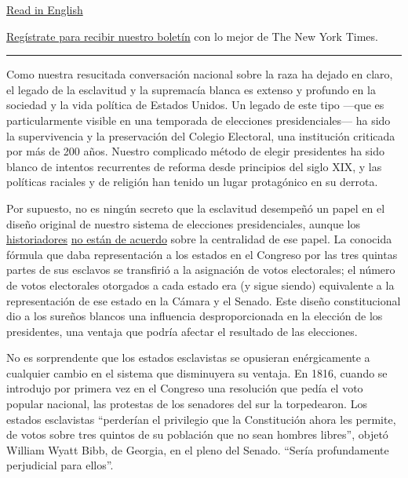 \href{https://www.nytimes.com/2020/08/03/opinion/electoral-college-racism-white-supremacy.html}{Read
in English}

\href{https://www.nytimes.com/newsletters/el-times}{Regístrate para
recibir nuestro boletín} con lo mejor de The New York Times.

\begin{center}\rule{0.5\linewidth}{\linethickness}\end{center}

Como nuestra resucitada conversación nacional sobre la raza ha dejado en
claro, el legado de la esclavitud y la supremacía blanca es extenso y
profundo en la sociedad y la vida política de Estados Unidos. Un legado
de este tipo ---que es particularmente visible en una temporada de
elecciones presidenciales--- ha sido la supervivencia y la preservación
del Colegio Electoral, una institución criticada por más de 200 años.
Nuestro complicado método de elegir presidentes ha sido blanco de
intentos recurrentes de reforma desde principios del siglo XIX, y las
políticas raciales y de religión han tenido un lugar protagónico en su
derrota.

Por supuesto, no es ningún secreto que la esclavitud desempeñó un papel
en el diseño original de nuestro sistema de elecciones presidenciales,
aunque los
\href{https://www.nytimes.com/2019/04/04/opinion/the-electoral-college-slavery-myth.html?action=click\&module=RelatedLinks\&pgtype=Article}{historiadores}
\href{https://www.nytimes.com/2019/04/06/opinion/electoral-college-slavery.html}{no
están de acuerdo} sobre la centralidad de ese papel. La conocida fórmula
que daba representación a los estados en el Congreso por las tres
quintas partes de sus esclavos se transfirió a la asignación de votos
electorales; el número de votos electorales otorgados a cada estado era
(y sigue siendo) equivalente a la representación de ese estado en la
Cámara y el Senado. Este diseño constitucional dio a los sureños blancos
una influencia desproporcionada en la elección de los presidentes, una
ventaja que podría afectar el resultado de las elecciones.

No es sorprendente que los estados esclavistas se opusieran
enérgicamente a cualquier cambio en el sistema que disminuyera su
ventaja. En 1816, cuando se introdujo por primera vez en el Congreso una
resolución que pedía el voto popular nacional, las protestas de los
senadores del sur la torpedearon. Los estados esclavistas ``perderían el
privilegio que la Constitución ahora les permite, de votos sobre tres
quintos de su población que no sean hombres libres'', objetó William
Wyatt Bibb, de Georgia, en el pleno del Senado. ``Sería profundamente
perjudicial para ellos''.

